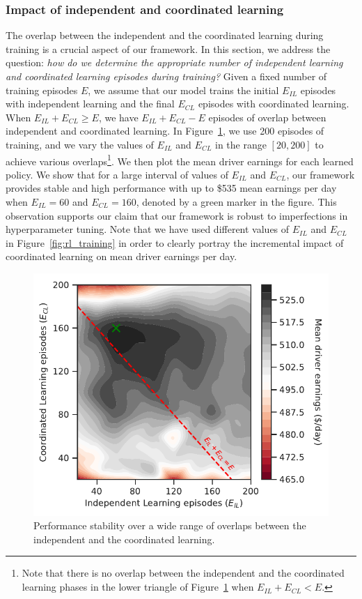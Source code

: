 \subsubsection{Impact of independent and coordinated learning}
The overlap between the independent 
    and the coordinated learning during training is a crucial 
    aspect of our framework.
In this section, we address the question:
    \textit{how do we determine
    the appropriate number of independent learning and coordinated learning
    episodes during training?}
Given a fixed number of training episodes $E$, we assume that 
    our model trains the initial $E_{IL}$ episodes with independent learning 
    and the final $E_{CL}$ episodes with coordinated learning. 
When $E_{IL} + E_{CL} \geq E$, we have $E_{IL} + E_{CL} - E$ episodes of overlap
    between independent and coordinated learning.
In Figure~\ref{fig:il_cl_overlap}, we use 200 episodes of training, and 
    we vary the values of $E_{IL}$ and $E_{CL}$ in the range $[20,200]$ to
    achieve various overlaps\footnote{Note that there is no overlap between 
    the independent and the coordinated learning phases
in the lower triangle of Figure~\ref{fig:il_cl_overlap} when $E_{IL} + E_{CL} < E$.}.
We then plot the mean driver earnings for each learned policy.
We show that for a large interval of values of $E_{IL}$ and $E_{CL}$, 
    our framework provides stable and high performance with up to
    \$535 mean earnings per day when $E_{IL}=60$ and $E_{CL}=160$,
    denoted by a green marker in the figure.
This observation supports our claim that our framework is robust to
    imperfections in hyperparameter tuning.
Note that we have used different values of $E_{IL}$ and $E_{CL}$ in
    Figure~\ref{fig:rl_training} in order to clearly portray the incremental
    impact of coordinated learning on mean driver earnings per day.


\begin{figure}
	\centering
    \includegraphics[scale=0.5]{figures/il_cl_overlap_200_episodes.pdf}
    \caption{Performance stability over a wide range of overlaps between the
    independent and the coordinated learning.}
	\label{fig:il_cl_overlap}
\end{figure}

